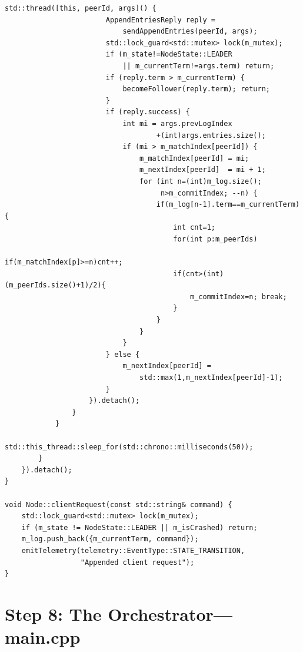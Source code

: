 \documentclass[11pt, a4paper]{article}
\begin{document}
\begin{lstlisting}[style=cppstyle, caption={Node.cpp --- becomeLeader() and clientRequest()}]
                    std::thread([this, peerId, args]() {
                        AppendEntriesReply reply =
                            sendAppendEntries(peerId, args);
                        std::lock_guard<std::mutex> lock(m_mutex);
                        if (m_state!=NodeState::LEADER
                            || m_currentTerm!=args.term) return;
                        if (reply.term > m_currentTerm) {
                            becomeFollower(reply.term); return;
                        }
                        if (reply.success) {
                            int mi = args.prevLogIndex
                                    +(int)args.entries.size();
                            if (mi > m_matchIndex[peerId]) {
                                m_matchIndex[peerId] = mi;
                                m_nextIndex[peerId]  = mi + 1;
                                for (int n=(int)m_log.size();
                                     n>m_commitIndex; --n) {
                                    if(m_log[n-1].term==m_currentTerm){
                                        int cnt=1;
                                        for(int p:m_peerIds)
                                            if(m_matchIndex[p]>=n)cnt++;
                                        if(cnt>(int)(m_peerIds.size()+1)/2){
                                            m_commitIndex=n; break;
                                        }
                                    }
                                }
                            }
                        } else {
                            m_nextIndex[peerId] =
                                std::max(1,m_nextIndex[peerId]-1);
                        }
                    }).detach();
                }
            }
            std::this_thread::sleep_for(std::chrono::milliseconds(50));
        }
    }).detach();
}

void Node::clientRequest(const std::string& command) {
    std::lock_guard<std::mutex> lock(m_mutex);
    if (m_state != NodeState::LEADER || m_isCrashed) return;
    m_log.push_back({m_currentTerm, command});
    emitTelemetry(telemetry::EventType::STATE_TRANSITION,
                  "Appended client request");
}
\end{lstlisting}

\newpage

\section{Step 8: The Orchestrator---main.cpp}
\end{document}
